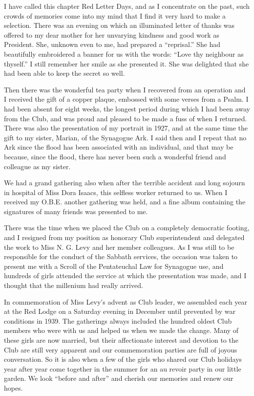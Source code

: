 I have called this chapter Red Letter Days, and as I
concentrate on the past, such crowds of memories come
into my mind that I find it very hard to make a selection.
There was an evening on which an illuminated
letter of thanks was offered to my dear mother
for her unvarying kindness and good work as President.
She, unknown even to me, had prepared a “reprisal.”
She had beautifully embroidered a banner for us with the
words: “Love thy neighbour as thyself.” I still remember
her smile as she presented it. She was delighted that
she had been able to keep the secret so well.

Then there was the wonderful tea party when I recovered
from an operation and I received the gift of a
copper plaque, embossed with some verses from a Psalm.
I had been absent for eight weeks, the longest period
during which I had been away from the Club, and was
proud and pleased to be made a fuss of when I returned.
There was also the presentation of my portrait in 1927,
and at the same time the gift to my sister, Marian, of the
Synagogue Ark. I said then and I repeat that no
Ark since the flood has been associated with an individual,
and that may be because, since the flood, there has
never been such a wonderful friend and colleague as my
sister.

We had a grand gathering also when after the terrible
accident and long sojourn in hospital of Miss Dora Isaacs,
this selfless worker returned to us. When I received my
O.B.E. another gathering was held, and a fine album
containing the signatures of many friends was presented
to me.

There was the time when we placed the Club on a completely
democratic footing, and I resigned from my position
as honorary Club superintendent and delegated the
work to Miss N. G. Levy and her member colleagues. As
I was still to be responsible for the conduct of the Sabbath
services, the occasion was taken to present me with a
Scroll of the Pentateuchal Law for Synagogue use, and
hundreds of girls attended the service at which the
presentation was made, and I thought that the millenium
had really arrived.

In commemoration of Miss Levy’s advent as Club
leader, we assembled each year at the Red Lodge on a
Saturday evening in December until prevented by war
conditions in 1939. The gatherings always included the
hundred oldest Club members who were with us and
helped us when we made the change. Many of these girls
are now married, but their affectionate interest and devotion
to the Club are still very apparent and our commemoration
parties are full of joyous conversation. So
it is also when a few of the girls who shared our Club
holidays year after year come together in the summer for
an au revoir party in our little garden. We look “before
and after” and cherish our memories and renew our
hopes.

